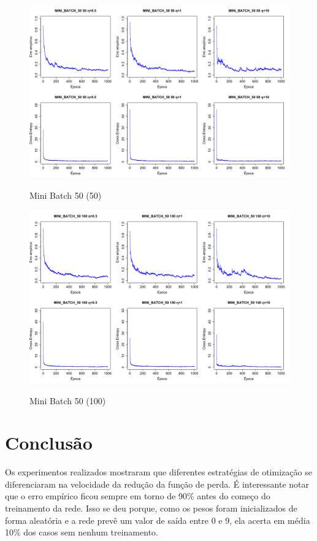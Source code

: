 \documentclass{report}
\begin{document}
\begin{figure}
  \includegraphics[width=\linewidth]{mini_batch_50_50.png}
  \label{fig:mini_batch_50_50}
  \caption{Mini Batch 50 (50)}
\end{figure}

\begin{figure}
  \includegraphics[width=\linewidth]{mini_batch_50_100.png}
  \label{fig:mini_batch_50_100}
  \caption{Mini Batch 50 (100)}
\end{figure}

\chapter{Conclusão}

Os experimentos realizados mostraram que diferentes estratégias de otimização se diferenciaram
na velocidade da redução da função de perda. É interessante notar que o erro empírico ficou
sempre em torno de 90\% antes do começo do treinamento da rede. Isso se deu porque, como os pesos
foram inicializados de forma aleatória e a rede prevê um valor de saída entre 0 e 9, ela
acerta em média 10\% dos casos sem nenhum treinamento.
\end{document}
